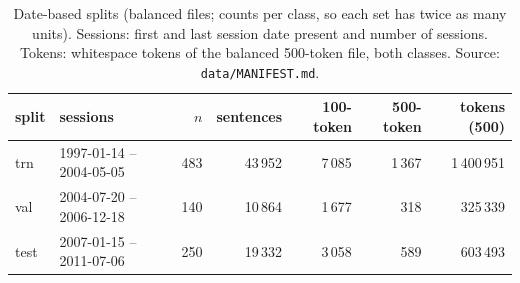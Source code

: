 \begin{table}[tbp]
\centering\small
\caption{Date-based splits (balanced files; counts per class, so each set has twice as many units).
Sessions: first and last session date present and number of sessions. Tokens: whitespace tokens
of the balanced 500-token file, both classes. Source: \texttt{data/MANIFEST.md}.}
\label{tab-data}
\begin{tabular}{@{}l l r r r r r@{}}
\toprule
split & sessions & $n$ & sentences & 100-token & 500-token & tokens (500) \\
\midrule
trn & 1997-01-14 -- 2004-05-05 & 483 & 43\,952 & 7\,085 & 1\,367 & 1\,400\,951 \\
val & 2004-07-20 -- 2006-12-18 & 140 & 10\,864 & 1\,677 & 318 & 325\,339 \\
test & 2007-01-15 -- 2011-07-06 & 250 & 19\,332 & 3\,058 & 589 & 603\,493 \\
\bottomrule
\end{tabular}
\end{table}
